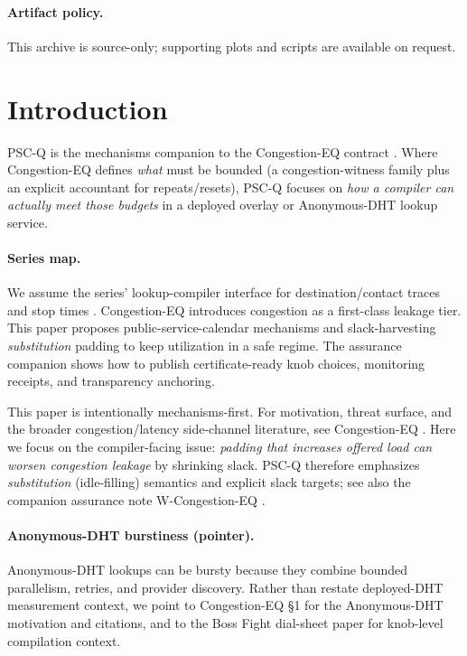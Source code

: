 \documentclass[11pt]{article}
\theoremstyle{definition}
\theoremstyle{remark}
\begin{document}
\paragraph{Artifact policy.}
This archive is source-only; supporting plots and scripts are available on request.\cite{series:artifactpolicy}


\section{Introduction}
PSC-Q is the mechanisms companion to the Congestion-EQ contract \cite{series:congeq}.
Where Congestion-EQ defines \emph{what} must be bounded (a congestion-witness family plus an explicit accountant for repeats/resets), PSC-Q focuses on \emph{how a compiler can actually meet those budgets} in a deployed overlay or Anonymous-DHT lookup service.

\paragraph{Series map.}
We assume the series' lookup-compiler interface for destination/contact traces and stop times \cite{series:schedcompiler,series:knapsacktransport}.
Congestion-EQ \cite{series:congeq} introduces congestion as a first-class leakage tier.
This paper proposes public-service-calendar mechanisms and slack-harvesting \emph{substitution} padding to keep utilization in a safe regime.
The assurance companion \cite{series:wcongeq} shows how to publish certificate-ready knob choices, monitoring receipts, and transparency anchoring.

This paper is intentionally mechanisms-first.
For motivation, threat surface, and the broader congestion/latency side-channel literature, see Congestion-EQ \cite{series:congeq}.
Here we focus on the compiler-facing issue: \emph{padding that increases offered load can worsen congestion leakage} by shrinking slack.
PSC-Q therefore emphasizes \emph{substitution} (idle-filling) semantics and explicit slack targets; see also the companion assurance note W-Congestion-EQ \cite{series:wcongeq}.

\paragraph{Anonymous-DHT burstiness (pointer).}
Anonymous-DHT lookups can be bursty because they combine bounded parallelism, retries, and provider discovery.
Rather than restate deployed-DHT measurement context, we point to Congestion-EQ \S1 for the Anonymous-DHT motivation and citations, and to the Boss Fight dial-sheet paper for knob-level compilation context.
\end{document}
